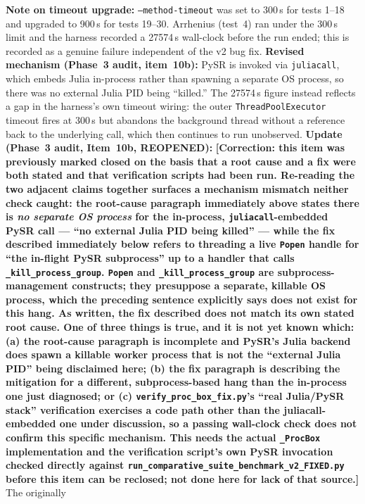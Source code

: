 \documentclass[twoside,11pt]{article}
\begin{document}
\textbf{Note on timeout upgrade:} \texttt{--method-timeout} was set to 300\,s
for tests 1--18 and upgraded to 900\,s for tests 19--30. Arrhenius (test~4)
ran under the 300\,s limit and the harness recorded a 27574\,s wall-clock
before the run ended; this is recorded as a genuine failure independent of
the v2 bug fix. \textbf{Revised mechanism (Phase~3 audit, item~10b):} PySR is
invoked via \texttt{juliacall}, which embeds Julia in-process rather than
spawning a separate OS process, so there was no external Julia PID being
``killed.'' The 27574\,s figure instead reflects a gap in the harness's own
timeout wiring: the outer \texttt{ThreadPoolExecutor} timeout fires at
300\,s but abandons the background thread without a reference back to the
underlying call, which then continues to run unobserved. \textbf{Update
(Phase~3 audit, Item~10b, REOPENED):} \textbf{[Correction: this item was
previously marked closed on the basis that a root cause and a fix were
both stated and that verification scripts had been run. Re-reading the two
adjacent claims together surfaces a mechanism mismatch neither check
caught: the root-cause paragraph immediately above states there is
\emph{no separate OS process} for the in-process, \texttt{juliacall}-embedded
PySR call --- ``no external Julia PID being killed'' --- while the fix
described immediately below refers to threading a live \texttt{Popen}
handle for ``the in-flight PySR subprocess'' up to a handler that calls
\texttt{\_kill\_process\_group}. \texttt{Popen} and
\texttt{\_kill\_process\_group} are subprocess-management constructs; they
presuppose a separate, killable OS process, which the preceding sentence
explicitly says does not exist for this hang. As written, the fix
described does not match its own stated root cause. One of three things is
true, and it is not yet known which: (a) the root-cause paragraph is
incomplete and PySR's Julia backend does spawn a killable worker process
that is not the ``external Julia PID'' being disclaimed here; (b) the fix
paragraph is describing the mitigation for a different, subprocess-based
hang than the in-process one just diagnosed; or (c)
\texttt{verify\_proc\_box\_fix.py}'s ``real Julia/PySR stack'' verification
exercises a code path other than the juliacall-embedded one under
discussion, so a passing wall-clock check does not confirm this specific
mechanism. This needs the actual \texttt{\_ProcBox} implementation and the
verification script's own PySR invocation checked directly against
\texttt{run\_comparative\_suite\_benchmark\_v2\_FIXED.py} before this item
can be reclosed; not done here for lack of that source.]} The originally
\end{document}

